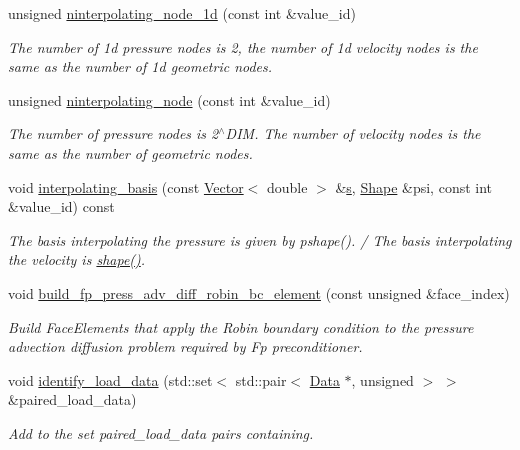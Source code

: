 \begin{DoxyCompactItemize}
unsigned \hyperlink{classoomph_1_1RefineableQTaylorHoodElement_a02da3cfeccf1f235b112db42e0fee9f6}{ninterpolating\+\_\+node\+\_\+1d} (const int \&value\+\_\+id)
\begin{DoxyCompactList}\small\item\em The number of 1d pressure nodes is 2, the number of 1d velocity nodes is the same as the number of 1d geometric nodes. \end{DoxyCompactList}\item 
unsigned \hyperlink{classoomph_1_1RefineableQTaylorHoodElement_a0348c238d8d1bf7afb2532d6f7d1f5a8}{ninterpolating\+\_\+node} (const int \&value\+\_\+id)
\begin{DoxyCompactList}\small\item\em The number of pressure nodes is 2$^\wedge$\+D\+IM. The number of velocity nodes is the same as the number of geometric nodes. \end{DoxyCompactList}\item 
void \hyperlink{classoomph_1_1RefineableQTaylorHoodElement_af6a401e81f0376d748178d8096d35835}{interpolating\+\_\+basis} (const \hyperlink{classoomph_1_1Vector}{Vector}$<$ double $>$ \&\hyperlink{cfortran_8h_ab7123126e4885ef647dd9c6e3807a21c}{s}, \hyperlink{classoomph_1_1Shape}{Shape} \&psi, const int \&value\+\_\+id) const
\begin{DoxyCompactList}\small\item\em The basis interpolating the pressure is given by pshape(). / The basis interpolating the velocity is \hyperlink{classoomph_1_1FiniteElement_a58a25b6859ddd43b7bfe64a19fee5023}{shape()}. \end{DoxyCompactList}\item 
void \hyperlink{classoomph_1_1RefineableQTaylorHoodElement_ab7f69a90be6e5129d2dbf294e01642af}{build\+\_\+fp\+\_\+press\+\_\+adv\+\_\+diff\+\_\+robin\+\_\+bc\+\_\+element} (const unsigned \&face\+\_\+index)
\begin{DoxyCompactList}\small\item\em Build Face\+Elements that apply the Robin boundary condition to the pressure advection diffusion problem required by Fp preconditioner. \end{DoxyCompactList}\item 
void \hyperlink{classoomph_1_1RefineableQTaylorHoodElement_af9358dd7b65ca4a1005980d50986db0d}{identify\+\_\+load\+\_\+data} (std\+::set$<$ std\+::pair$<$ \hyperlink{classoomph_1_1Data}{Data} $\ast$, unsigned $>$ $>$ \&paired\+\_\+load\+\_\+data)
\begin{DoxyCompactList}\small\item\em Add to the set {\ttfamily paired\+\_\+load\+\_\+data} pairs containing. \end{DoxyCompactList}\end{DoxyCompactItemize}
